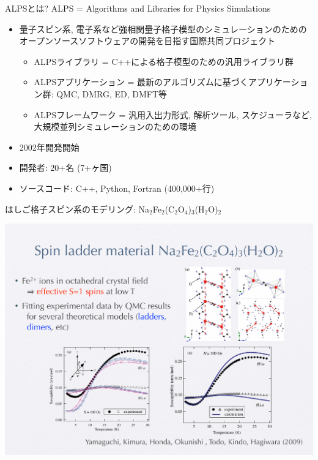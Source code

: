\begin{frame}[t,fragile]{ALPSとは?}
  ALPS = \alert{A}lgorithms and \alert{L}ibraries for \alert{P}hysics \alert{S}imulations
  \begin{itemize}
  \item 量子スピン系, 電子系など強相関量子格子模型のシミュレーションのためのオープンソースソフトウェアの開発を目指す国際共同プロジェクト
    \begin{itemize}
    \item ALPSライブラリ = C++による格子模型のための汎用ライブラリ群
    \item ALPSアプリケーション = 最新のアルゴリズムに基づくアプリケーション群: QMC, DMRG, ED, DMFT等
    \item ALPSフレームワーク = 汎用入出力形式, 解析ツール, スケジューラなど, 大規模並列シミュレーションのための環境
    \end{itemize}
  \item 2002年開発開始
  \item 開発者: 20+名 (7+ヶ国)
  \item ソースコード: C++, Python, Fortran (400,000+行)
  \end{itemize}
\end{frame}

\begin{frame}[fragile]{はしご格子スピン系のモデリング: Na$_2$Fe$_2$(C$_2$O$_4$)$_3$(H$_2$O)$_2$}
  \begin{center}
    \includegraphics[height=.8\textheight]{ladder.pdf}
  \end{center}
\end{frame}

